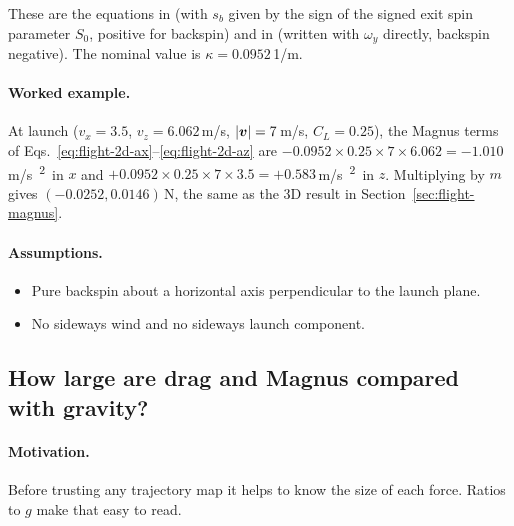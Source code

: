 These are the equations in  (with $s_b$ given by the sign of the
signed exit spin parameter $S_0$, positive for backspin) and in 
(written with $\omega_y$ directly, backspin negative).
The nominal value is $\kappa = 0.0952$\,\unit{1/m}\derived.

\paragraph{Worked example.}
At launch ($v_x = 3.5$\assumed, $v_z = 6.062$\,\unit{m/s}\derived, $|\bm{v}| = 7$\,\unit{m/s}\assumed,
$C_L = 0.25$\derived), the Magnus terms of Eqs.~\eqref{eq:flight-2d-ax}--\eqref{eq:flight-2d-az} are
$-0.0952\times0.25\times7\times6.062 = -1.010$\,\unit{m/s\textsuperscript{2}}\derived\ in $x$ and
$+0.0952\times0.25\times7\times3.5 = +0.583$\,\unit{m/s\textsuperscript{2}}\derived\ in $z$.
Multiplying by $m$ gives $(-0.0252, 0.0146)$\,\unit{N}\derived, the same as the 3D 
result in Section~\ref{sec:flight-magnus}.

\paragraph{Assumptions.}
\begin{itemize}
  \item Pure backspin about a horizontal axis perpendicular to the launch plane.
  \item No sideways wind and no sideways launch component.
\end{itemize}

\subsection{How large are drag and Magnus compared with gravity?}
\label{sec:flight-scale}

\paragraph{Motivation.}
Before trusting any trajectory map it helps to know the size of each force.
Ratios to $g$ make that easy to read.

